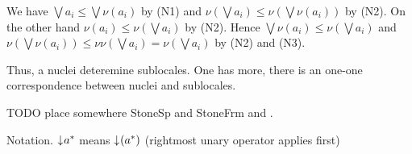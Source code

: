     \noindent We have $\bigvee a_i \leq \bigvee \nu(a_i)$ by (N1) and $\nu(\bigvee a_i) \leq \nu(\bigvee \nu(a_i))$ by (N2). On the other hand $\nu(a_i) \leq \nu(\bigvee a_i)$ by (N2). Hence $\bigvee \nu(a_i) \leq \nu(\bigvee a_i)$ and $\nu(\bigvee \nu(a_i)) \leq \nu\nu(\bigvee a_i) = \nu(\bigvee a_i)$ by (N2) and (N3).

    Thus, a nuclei deteremine sublocales. One has more, there is an one-one correspondence between nuclei and sublocales.

\noindent\dotfill

TODO place somewhere StoneSp and StoneFrm and \J.

Notation.
$\mathord{\downarrow}\mkern1mu a^*$ means $\mathord{\downarrow}\mkern1mu (a^*)$ (rightmost unary operator applies first)

